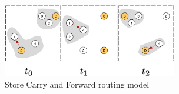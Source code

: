 \begin{figure}[!t]
	\centering
	\includegraphics[width=3in]{Figures/SFC.pdf}
	\caption{Store Carry and Forward routing model}
	\label{SFC}
\end{figure}




